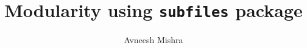 

\title{Modularity using \texttt{subfiles} package}
\author{Avneesh Mishra}


    \maketitle
    \tableofcontents
    
    
    
    \appendix
    


